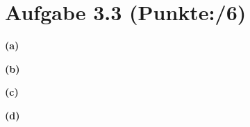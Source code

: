 \documentclass[11pt, a4paper]{article}
\newcommand{\blattnummer}{3}
\newcommand{\ppp}{6}
\newcommand{\aufgabe}[2] {\section*{Aufgabe \blattnummer.#1 (Punkte:\qquad/#2)}}
\newcommand{\aufgabenteil}[1] {\textbf{(#1)}}
\begin{document}
\aufgabe{3}{\ppp}
\aufgabenteil{a}
\begin{adjustwidth}{20pt}{20pt}

\end{adjustwidth}
\aufgabenteil{b}
\begin{adjustwidth}{20pt}{20pt}

\end{adjustwidth}
\aufgabenteil{c}
\begin{adjustwidth}{20pt}{20pt}

\end{adjustwidth}
\aufgabenteil{d}
\begin{adjustwidth}{20pt}{20pt}

\end{adjustwidth}
\end{document}
